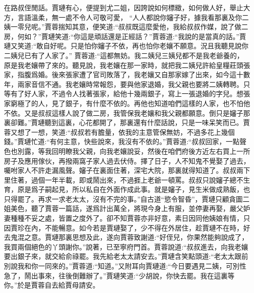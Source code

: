 \begin{parag}
    在路叔侄閒話。賈璉有心，便提到尤二姐，因誇說如何標緻，如何做人好，舉止大方，言語溫柔，無一處不令人可敬可愛， “人人都說你嬸子好，據我看那裏及你二姨一零兒呢。”賈蓉揣知其意，便笑道:“叔叔既這麼愛他，我給叔叔作媒，說了做二房，何如？”賈璉笑道:“你這是頑話還是正經話？”賈蓉道:“我說的是當真的話。”賈璉又笑道:“敢自好呢。只是怕你嬸子不依，再也怕你老孃不願意。況且我聽見說你二姨兒已有了人家了。” 賈蓉道:“這都無妨。我二姨兒三姨兒都不是我老爺養的，原是我老孃帶了來的。聽見說，我老孃在那一家時，就把我二姨兒許給皇糧莊頭張家，指腹爲婚。後來張家遭了官司敗落了，我老孃又自那家嫁了出來，如今這十數年，兩家音信不通。我老孃時常報怨，要與他家退婚，我父親也要將二姨轉聘。只等有了好人家，不過令人找著張家，給他十幾兩銀子，寫上一張退婚的字兒。想張家窮極了的人，見了銀子，有什麼不依的。再他也知道咱們這樣的人家，也不怕他不依。又是叔叔這樣人說了做二房，我管保我老孃和我父親都願意。倒只是嬸子那裏卻難。”賈璉聽到這裏，心花都開了，那裏還有什麼話說，只是一味呆笑而已。賈蓉又想了一想，笑道:“叔叔若有膽量，依我的主意管保無妨，不過多花上幾個錢。”賈璉忙道:“有何主意，快些說來，我沒有不依的。”賈蓉道:“叔叔回家，一點聲色也別露，等我回明瞭我父親，向我老孃說妥，然後在咱們府後方近左右買上一所房子及應用傢伙，再撥兩窩子家人過去伏侍。擇了日子，人不知鬼不覺娶了過去，囑咐家人不許走漏風聲。嬸子在裏面住著，深宅大院，那裏就得知道了。叔叔兩下里住著，過個一年半載，即或鬧出來，不過捱上老爺一頓罵。叔叔只說嬸子總不生育，原是爲子嗣起見，所以私自在外面作成此事。就是嬸子，見生米做成熟飯，也只得罷了。再求一求老太太，沒有不完的事。”自古道“慾令智昏”，賈璉只顧貪圖二姐美色，聽了賈蓉一篇話，遂爲計出萬全，將現今身上有服，並停妻再娶，嚴父妒妻種種不妥之處，皆置之度外了。卻不知賈蓉亦非好意，素日因同他姨娘有情，只因賈珍在內，不能暢意。如今若是賈璉娶了，少不得在外居住，趁賈璉不在時，好去鬼混之意。賈璉那裏思想及此，遂向賈蓉致謝道:“好侄兒，你果然能夠說成了，我買兩個絕色的丫頭謝你。”說著，已至寧府門首。賈蓉說道:“叔叔進去，向我老孃要出銀子來，就交給俞祿罷。我先給老太太請安去。”賈璉含笑點頭道:“老太太跟前別說我和你一同來的。”賈蓉道:“知道。”又附耳向賈璉道:“今日要遇見二姨，可別性急了，鬧出事來，往後倒難辦了。”賈璉笑道:“少胡說，你快去罷。我在這裏等你。”於是賈蓉自去給賈母請安。
\end{parag}


